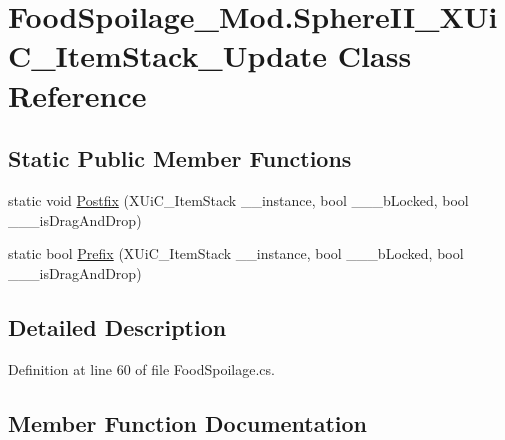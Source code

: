 \hypertarget{class_food_spoilage___mod_1_1_sphere_i_i___x_ui_c___item_stack___update}{}\section{Food\+Spoilage\+\_\+\+Mod.\+Sphere\+I\+I\+\_\+\+X\+Ui\+C\+\_\+\+Item\+Stack\+\_\+\+Update Class Reference}
\label{class_food_spoilage___mod_1_1_sphere_i_i___x_ui_c___item_stack___update}
\subsection*{Static Public Member Functions}
\begin{DoxyCompactItemize}
\item 
static void \mbox{\hyperlink{class_food_spoilage___mod_1_1_sphere_i_i___x_ui_c___item_stack___update_a66bbf548465cbd7586ed5c6e63e0bdfb}{Postfix}} (X\+Ui\+C\+\_\+\+Item\+Stack \+\_\+\+\_\+instance, bool \+\_\+\+\_\+\+\_\+b\+Locked, bool \+\_\+\+\_\+\+\_\+is\+Drag\+And\+Drop)
\item 
static bool \mbox{\hyperlink{class_food_spoilage___mod_1_1_sphere_i_i___x_ui_c___item_stack___update_abc543c92273c34f9628f696abad49c84}{Prefix}} (X\+Ui\+C\+\_\+\+Item\+Stack \+\_\+\+\_\+instance, bool \+\_\+\+\_\+\+\_\+b\+Locked, bool \+\_\+\+\_\+\+\_\+is\+Drag\+And\+Drop)
\end{DoxyCompactItemize}


\subsection{Detailed Description}


Definition at line 60 of file Food\+Spoilage.\+cs.



\subsection{Member Function Documentation}
\mbox{\label{class_food_spoilage___mod_1_1_sphere_i_i___x_ui_c___item_stack___update_a66bbf548465cbd7586ed5c6e63e0bdfb}} 
